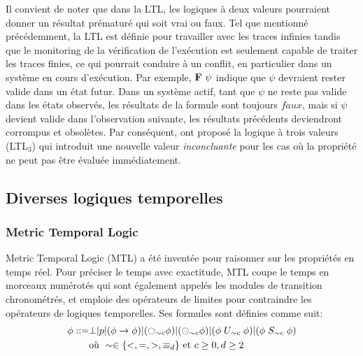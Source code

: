 Il convient de noter que dans la LTL, les logiques à deux valeurs pourraient donner un résultat prématuré qui soit vrai ou faux. Tel que mentionné précédemment, la LTL est définie pour travailler avec les traces infinies tandis que le monitoring de la vérification de l'exécution est seulement capable de traiter les traces finies, ce qui pourrait conduire à un conflit, en particulier dans un système en cours d'exécution. Par exemple, $\mathop{\mbox{\textbf{F}}}\, \psi$ indique que $\psi$ devraient rester valide dans un état futur. Dans un système actif, tant que $\psi$ ne reste pas valide dans les états observés, les résultats de la formule sont toujours $faux$, mais si $\psi$ devient valide dans l'observation suivante, les résultats précédents deviendront corrompus et obsolètes. Par conséquent, \cite{bauer2006monitoring} ont proposé la logique à trois valeurs (LTL$_3$) qui introduit une nouvelle valeur \emph{inconcluante} pour les cas où la propriété ne peut pas être évaluée immédiatement.

\subsection{Diverses logiques temporelles}

\subsubsection{Metric Temporal Logic}

Metric Temporal Logic (MTL) \citep{chang1994compositional} a été inventée pour raisonner sur les propriétés en temps réel. Pour préciser le temps avec exactitude, MTL coupe le temps en morceaux numérotés qui sont également appelés les modules de transition chronométrés, et emploie des opérateurs de limites pour contraindre les opérateurs de logiques temporelles. Ses formules sont définies comme suit:
\begin{align*}
\phi ::= & \bot | p | (\phi \rightarrow \phi) | (\fullmoon_{\sim{}c}\phi) | (\circleddash_{\sim{}c}\phi) | (\phi \mathrel{U}_{\sim{}c} \phi) | (\phi \mathrel{S}_{\sim{}c} \phi) \\
& \mbox{où } \sim \in \{<, =, >, \equiv_d\} \mbox{ et } c \geq 0, d \geq 2
\end{align*}


